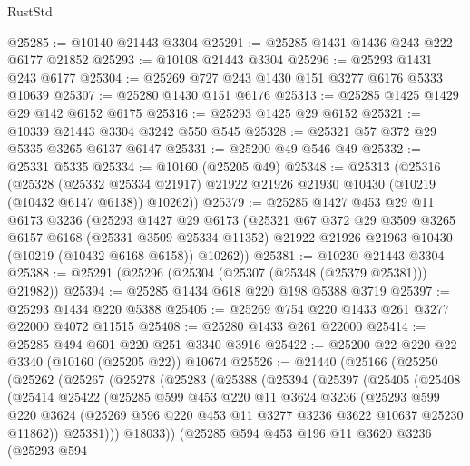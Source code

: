 \begin{lexlean}{RustStd}
\begin{coremodule}
@25285 := @10140 @21443 @3304
@25291 := @25285 @1431 @1436 @243 @222 @6177 @21852
@25293 := @10108 @21443 @3304
@25296 := @25293 @1431 @243 @6177
@25304 := @25269 @727 @243 @1430 @151 @3277 @6176 @5333 @10639
@25307 := @25280 @1430 @151 @6176
@25313 := @25285 @1425 @1429 @29 @142 @6152 @6175
@25316 := @25293 @1425 @29 @6152
@25321 := @10339 @21443 @3304 @3242 @550 @545
@25328 := @25321 @57 @372 @29 @5335 @3265 @6137 @6147
@25331 := @25200 @49 @546 @49
@25332 := @25331 @5335
@25334 := @10160 (@25205 @49)
@25348 := @25313
    (@25316
      (@25328
        (@25332 @25334 @21917)
        @21922
        @21926
        @21930
        @10430
        (@10219 (@10432 @6147 @6138))
        @10262))
@25379 := @25285
    @1427
    @453
    @29
    @11
    @6173
    @3236
    (@25293
      @1427
      @29
      @6173
      (@25321
        @67
        @372
        @29
        @3509
        @3265
        @6157
        @6168
        (@25331 @3509 @25334 @11352)
        @21922
        @21926
        @21963
        @10430
        (@10219 (@10432 @6168 @6158))
        @10262))
@25381 := @10230 @21443 @3304
@25388 := @25291 (@25296 (@25304 (@25307 (@25348 (@25379 @25381))) @21982))
@25394 := @25285 @1434 @618 @220 @198 @5388 @3719
@25397 := @25293 @1434 @220 @5388
@25405 := @25269 @754 @220 @1433 @261 @3277 @22000 @4072 @11515
@25408 := @25280 @1433 @261 @22000
@25414 := @25285 @494 @601 @220 @251 @3340 @3916
@25422 := @25200 @22 @220 @22 @3340 (@10160 (@25205 @22)) @10674
@25526 := @21440
    (@25166
      (@25250
        (@25262
          (@25267
            (@25278
              (@25283
                (@25388
                  (@25394
                    (@25397
                      (@25405
                        (@25408
                          (@25414
                            @25422
                            (@25285
                              @599
                              @453
                              @220
                              @11
                              @3624
                              @3236
                              (@25293
                                @599
                                @220
                                @3624
                                (@25269 @596 @220 @453 @11 @3277 @3236 @3622 @10637 @25230 @11862))
                              @25381)))
                        @18033))
                    (@25285
                      @594
                      @453
                      @196
                      @11
                      @3620
                      @3236
                      (@25293
                        @594

\end{coremodule}
\end{lexlean}
